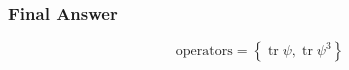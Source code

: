 \subsubsection*{Final Answer}

\[
\boxed{
\mathrm{operators}=\left\{\operatorname{tr}\psi,\operatorname{tr}\psi^3\right\}
}
\]
